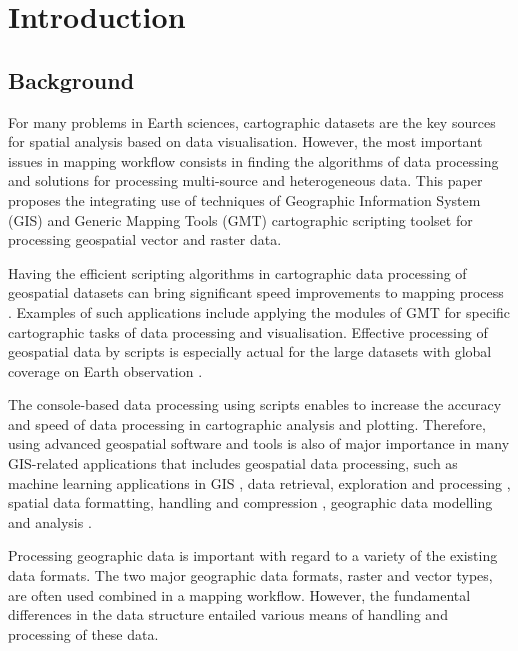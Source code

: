 \documentclass[data,article,submit,pdftex,moreauthors]{Definitions/mdpi}
\begin{document}

\section{Introduction}

\subsection{Background}

For many problems in Earth sciences, cartographic datasets are the key sources for spatial analysis based on data visualisation. However, the most important issues in mapping workflow consists in finding the algorithms of data processing and solutions for processing multi-source and heterogeneous data. This paper proposes the integrating use of techniques of Geographic Information System (GIS) and Generic Mapping Tools (GMT) cartographic scripting toolset for processing geospatial vector and raster data.

Having the efficient scripting algorithms in cartographic data processing of geospatial datasets can bring significant speed improvements to mapping process \cite{CHEN2022105362,ORTOLANO201856, Lemenkova202203,OMRAN2016140,data5010008}. Examples of such applications include applying the modules of GMT for specific cartographic tasks of data processing and visualisation. Effective processing of geospatial data by scripts is especially actual for the large datasets with global coverage on Earth observation \cite{LEI2020202,XIA2018245,NATIVI20151,WAGEMANN2021104916}. 

The console-based data processing using scripts enables to increase the accuracy and speed of data processing in cartographic analysis and plotting. Therefore, using advanced geospatial software and tools is also of major importance in many GIS-related applications that includes geospatial data processing, such as machine learning applications in GIS \cite{1607434,ARABAMERI2021100848,ZUO2021105111,SUN201926}, data retrieval, exploration and processing \cite{BUCK2022121,Lemenkova202135,1369823}, spatial data formatting, handling and compression \cite{ZHU2022104166,data4030118,data6080081,DEMIRALTINTAS2021103743}, geographic data modelling and analysis \cite{MA2021103858,Lemenkova202205,TAMIMINIA2020152}. 

Processing geographic data is important with regard to a variety of the existing data formats. The two major geographic data formats, raster and vector types, are often used combined in a mapping workflow. However, the fundamental differences in the data structure entailed various means of handling and processing of these data.
\end{document}
